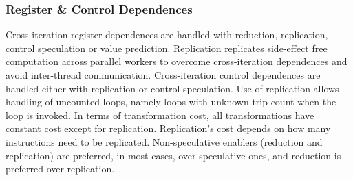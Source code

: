 \subsubsection{Register \& Control Dependences}

Cross-iteration register dependences
are handled with reduction, replication, control speculation or value
prediction. Replication replicates side-effect free computation across
parallel workers to overcome cross-iteration dependences and avoid
inter-thread communication.
%
Cross-iteration control dependences are handled either with
replication or control speculation.
Use of replication allows handling of uncounted loops, namely loops
with unknown trip count when the loop is invoked.
%
In terms of transformation cost, all transformations have constant
cost except for replication.  Replication's cost depends on how many
instructions need to be replicated. Non-speculative enablers
(reduction and replication) are preferred, in most cases, over
speculative ones, and reduction is preferred over replication.


%

%
%
%
%
%
%
%
